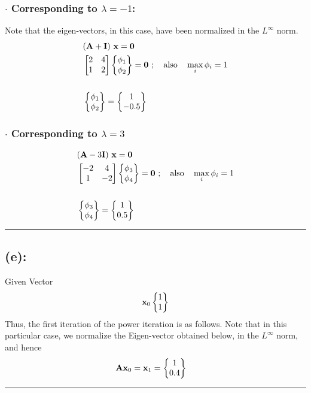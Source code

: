 \subsubsection*{$\cdot$ Corresponding to $\lambda = -1$:}
Note that the eigen-vectors, in this case, have been normalized in the $L^\infty$ norm. 
\begin{align*}
& ({\bf A} + {\bf I})\ {\bf x} = {\bf 0} \\
& \begin{bmatrix}
2 & 4 \\
1 & 2
\end{bmatrix}
\begin{Bmatrix}
\phi_1 \\ \phi_2
\end{Bmatrix} = {\bf 0}\ ;\ \ \ \text{also}\ \ \ \max_i{\phi_i} = 1 \\ \\
& \begin{Bmatrix}
\phi_1 \\ \phi_2
\end{Bmatrix} = 
\begin{Bmatrix}
1	\\ -0.5
\end{Bmatrix}
\end{align*}
\subsubsection*{$\cdot$ Corresponding to $\lambda = 3$}
\begin{align*}
& ({\bf A} -3 {\bf I})\ {\bf x} = {\bf 0} \\
& \begin{bmatrix}
-2 & 4 \\
1 & -2
\end{bmatrix}
\begin{Bmatrix}
\phi_3 \\ \phi_4
\end{Bmatrix} = {\bf 0}\ ;\ \ \ \text{also}\ \ \ \max_i \phi_i = 1 \\ \\
& \begin{Bmatrix}
\phi_3 \\ \phi_4
\end{Bmatrix} = 
\begin{Bmatrix}
1 \\ 0.5
\end{Bmatrix}
\end{align*}\hrule
\subsection*{(e):}
Given Vector
\[{\bf x}_0
\begin{Bmatrix}
1 \\ 1
\end{Bmatrix}
\]
Thus, the first iteration of the power iteration is as follows. Note that in this particular case, we normalize the Eigen-vector obtained below, in the $L^\infty$ norm, and hence 
\begin{align*}
& {\bf A}{\bf x}_0
={\bf x}_1 = 
\begin{Bmatrix}
1 \\ 0.4
\end{Bmatrix}
\end{align*}\hrule
